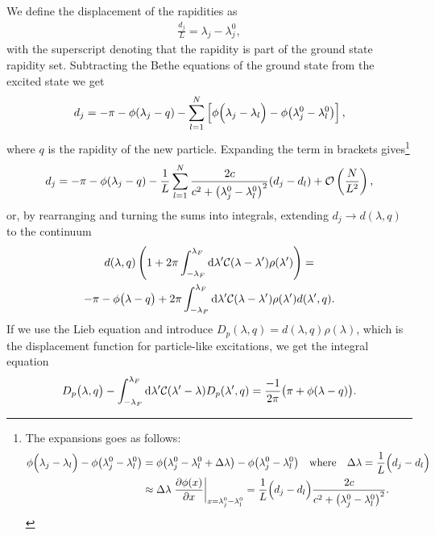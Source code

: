 \documentclass[11pt, a4paper]{report} %
\begin{document}
We define the displacement of the rapidities as~\cite{Caux2015}
\begin{align}
  \label{eq:24}
  \frac{d_j}{L} = \lambda_j - \lambda_j^0,
\end{align}
with the superscript denoting that the rapidity is part of the ground state rapidity set.
Subtracting the Bethe equations of the ground state from the excited state we get~\cite{Franchini2017,Caux2015}
\begin{align}
  \label{eq:25}
   d_j = - \pi - \phi\qty(\lambda_j-q) - \sum_{l=1}^{N} \left[\phi\qty\Big(\lambda_j - \lambda_l) - \phi\qty(\lambda_j^0-\lambda_l^0)\right],
\end{align}
where \(q\) is the rapidity of the new particle.
Expanding the term in brackets gives\footnote{The expansions goes as follows:
  \begin{align*}
    \phi\qty\Big(\lambda_j-\lambda_l) - \phi\qty(\lambda_j^0 - \lambda_l^0) &= \phi\qty(\lambda_j^0 - \lambda_l^0 + \Delta\lambda) - \phi\qty(\lambda_j^0 - \lambda_l^0) \quad \mathrm{where}\quad \Delta \lambda = \frac{1}{L}\qty\Big(d_j - d_l)\\
    &\approx\Delta \lambda \eval{\frac{\partial\phi(x)}{\partial x}}_{x = \lambda_j^0-\lambda_l^0}
    = \frac{1}{L}\qty\Big(d_j-d_l) \frac{2c}{c^2 + {\qty(\lambda_j^0-\lambda_l^0)}^2}.
  \end{align*}
}
\begin{align}
  \label{eq:27}
  d_j = -\pi - \phi\qty(\lambda_j-q) - \frac{1}{L} \sum_{l=1}^N \frac{2c}{c^2 + {\qty(\lambda_j^0-\lambda_l^0)}^2} \qty(d_j-d_l) + \mathcal{O}\left(\frac{N}{L^2}\right),
\end{align}
or, by rearranging and turning the sums into integrals, extending \(d_j\to d(\lambda,q)\) to the continuum
\begin{multline}
  \label{eq:28}
  d(\lambda,q) \left(1+2\pi \int_{-\lambda_F}^{\lambda_F} \dd \lambda'\mathcal{C}\qty(\lambda-\lambda')\rho\qty(\lambda')\right) = \\-\pi -\phi\qty\big(\lambda-q) + 2\pi \int_{-\lambda_F}^{\lambda_F} \dd \lambda' \mathcal{C}\qty(\lambda-\lambda') \rho\qty(\lambda') d\qty(\lambda',q).
\end{multline}
If we use the Lieb equation and introduce \(D_p(\lambda,q)=d(\lambda,q)\rho(\lambda)\), which is the displacement function for particle-like excitations, we get the integral equation~\cite{Caux2015,Franchini2017}
\begin{align}
  \label{eq:partdisplacement}
  D_p\qty\big(\lambda,q) - \int_{-\lambda_F}^{\lambda_F} \dd \lambda' \mathcal{C}\qty(\lambda'-\lambda) D_p\qty(\lambda', q) = \frac{-1}{2\pi} \qty\big(\pi+\phi(\lambda-q)).
\end{align}
\end{document}
